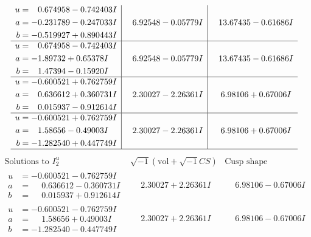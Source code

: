 \documentclass[1p]{elsarticle_modified}
\theoremstyle{definition}
\newcommand{\I}{\sqrt{-1}}
\begin{document}
$$\begin{array}{c|c|c}
\begin{aligned}
u &= \phantom{-}0.674958 - 0.742403 I \\
a &= -0.231789 - 0.247033 I \\
b &= -0.519927 + 0.890443 I\end{aligned}
 & \phantom{-}6.92548 - 0.05779 I & \phantom{-}13.67435 - 0.61686 I \\ \hline\begin{aligned}
u &= \phantom{-}0.674958 - 0.742403 I \\
a &= -1.89732 + 0.65378 I \\
b &= \phantom{-}1.47394 - 0.15920 I\end{aligned}
 & \phantom{-}6.92548 - 0.05779 I & \phantom{-}13.67435 - 0.61686 I \\ \hline\begin{aligned}
u &= -0.600521 + 0.762759 I \\
a &= \phantom{-}0.636612 + 0.360731 I \\
b &= \phantom{-}0.015937 - 0.912614 I\end{aligned}
 & \phantom{-}2.30027 - 2.26361 I & \phantom{-}6.98106 + 0.67006 I \\ \hline\begin{aligned}
u &= -0.600521 + 0.762759 I \\
a &= \phantom{-}1.58656 - 0.49003 I \\
b &= -1.282540 + 0.447749 I\end{aligned}
 & \phantom{-}2.30027 - 2.26361 I & \phantom{-}6.98106 + 0.67006 I\\
 \hline 
 \end{array}$$\newpage$$\begin{array}{c|c|c}  
\text{Solutions to }I^u_{2}& \I (\text{vol} + \sqrt{-1}CS) & \text{Cusp shape}\\
 \hline 
\begin{aligned}
u &= -0.600521 - 0.762759 I \\
a &= \phantom{-}0.636612 - 0.360731 I \\
b &= \phantom{-}0.015937 + 0.912614 I\end{aligned}
 & \phantom{-}2.30027 + 2.26361 I & \phantom{-}6.98106 - 0.67006 I \\ \hline\begin{aligned}
u &= -0.600521 - 0.762759 I \\
a &= \phantom{-}1.58656 + 0.49003 I \\
b &= -1.282540 - 0.447749 I\end{aligned}
 & \phantom{-}2.30027 + 2.26361 I & \phantom{-}6.98106 - 0.67006 I \\ \hline\begin{aligned}

\end{aligned}
\end{array}$$
\end{document}
